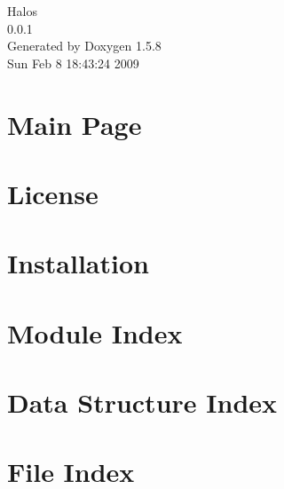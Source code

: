 \documentclass[a4paper]{book}
\begin{document}
\begin{titlepage}
\vspace*{7cm}
\begin{center}
{\Large Halos \\[1ex]\large 0.0.1 }\\
\vspace*{1cm}
{\large Generated by Doxygen 1.5.8}\\
\vspace*{0.5cm}
{\small Sun Feb 8 18:43:24 2009}\\
\end{center}
\end{titlepage}
\clearemptydoublepage
{}
\tableofcontents
\clearemptydoublepage
{}
\chapter{Main Page}
\label{index}\hypertarget{index}{}
\chapter{License}
\label{License}
\hypertarget{License}{}

\chapter{Installation}
\label{Installation}
\hypertarget{Installation}{}

\chapter{Module Index}

\chapter{Data Structure Index}

\chapter{File Index}

\end{document}
